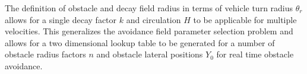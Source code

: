 \documentclass[conf]{new-aiaa}
\begin{document}
The definition of obstacle and decay field radius in terms of vehicle turn radius $\theta_r$ allows for a single decay factor $k$ and circulation $H$ to be applicable for multiple velocities. This generalizes the avoidance field parameter selection problem and allows for a two dimensional lookup table to be generated for a number of obstacle radius factors $n$ and obstacle lateral positions $Y_0$ for real time obstacle avoidance. \\



%
%
%
%
%
%
\end{document}
